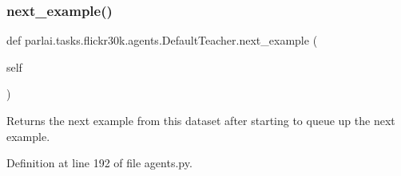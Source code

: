 \subsubsection{\texorpdfstring{next\+\_\+example()}{next\_example()}}
{\footnotesize\ttfamily def parlai.\+tasks.\+flickr30k.\+agents.\+Default\+Teacher.\+next\+\_\+example (\begin{DoxyParamCaption}\item[{}]{self }\end{DoxyParamCaption})}

\begin{DoxyVerb}Returns the next example from this dataset after starting to queue up the next
example.
\end{DoxyVerb}
 

Definition at line 192 of file agents.\+py.


